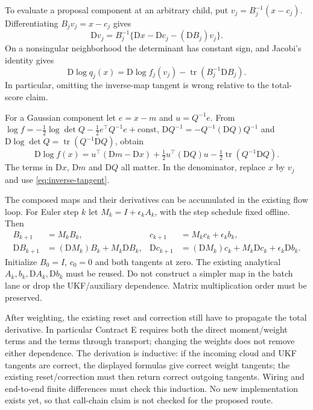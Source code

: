\documentclass[11pt]{article}
\newcommand{\D}{\mathrm D}
\newcommand{\tr}{\operatorname{tr}}
\begin{document}
To evaluate a proposal component at an arbitrary child, put
$v_j=B_j^{-1}(x-c_j)$. Differentiating $B_jv_j=x-c_j$ gives
\begin{equation}
 \D v_j=B_j^{-1}\{\D x-\D c_j-(\D B_j)v_j\}.
 \label{eq:inverse-tangent}
\end{equation}
On a nonsingular neighborhood the determinant has constant sign, and
Jacobi's identity gives
\begin{equation}
 \D\log q_j(x)=\D\log f_j(v_j)
                      -\tr(B_j^{-1}\D B_j).
 \label{eq:proposal-score}
\end{equation}
In particular, omitting the inverse-map tangent is wrong relative to the
total-score claim.

For a Gaussian component let $e=x-m$ and $u=Q^{-1}e$.
From $\log f=-\tfrac12\log\det Q-\tfrac12 e^\top Q^{-1}e+\mathrm{const}$,
$\D Q^{-1}=-Q^{-1}(\D Q)Q^{-1}$ and
$\D\log\det Q=\tr(Q^{-1}\D Q)$, obtain
\begin{equation}
 \D\log f(x)
 =u^\top(\D m-\D x)
  +\tfrac12u^\top(\D Q)u-\tfrac12\tr(Q^{-1}\D Q).
 \label{eq:gaussian-score}
\end{equation}
The terms in $\D x$, $\D m$ and $\D Q$ all matter. In the denominator,
replace $x$ by $v_j$ and use \eqref{eq:inverse-tangent}.

The composed maps and their derivatives can be accumulated in the existing
flow loop. For Euler step $k$ let $M_k=I+\epsilon_k A_k$, with the step
schedule fixed offline. Then
\begin{align}
 B_{k+1}&=M_k B_k,& c_{k+1}&=M_k c_k+\epsilon_k b_k,
 \label{eq:map-composition}\\
 \D B_{k+1}&=(\D M_k)B_k+M_k\D B_k,&
 \D c_{k+1}&=(\D M_k)c_k+M_k\D c_k+\epsilon_k\D b_k .
 \label{eq:map-tangent}
\end{align}
Initialize $B_0=I$, $c_0=0$ and both tangents at zero.
The existing analytical $A_k,b_k,\D A_k,\D b_k$ must be reused.
Do not construct a simpler map in the batch lane or drop the UKF/auxiliary
dependence. Matrix multiplication order must be preserved.

After weighting, the existing reset and correction still have to propagate
the total derivative. In particular Contract E requires both the direct
moment/weight terms and the terms through transport; changing the weights
does not remove either dependence. The derivation is inductive: if the
incoming cloud and UKF tangents are correct, the displayed formulas give
correct weight tangents; the existing reset/correction must then return
correct outgoing tangents. Wiring and end-to-end finite differences must
check this induction. No new implementation exists yet, so that call-chain
claim is not checked for the proposed route.
\end{document}
